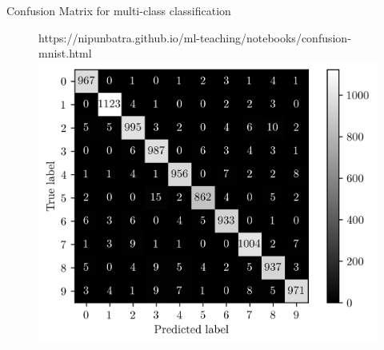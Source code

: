 \documentclass[usenames,dvipsnames]{beamer}
\begin{document}










\begin{frame}{Confusion Matrix for multi-class classification}
	\begin{figure}[htp]
		\centering
		\begin{notebookbox}{https://nipunbatra.github.io/ml-teaching/notebooks/confusion-mnist.html}
		  \includegraphics[scale=0.5]{../assets/accuracy-convention/figures/mnist-cm.png}
		\end{notebookbox}
	  \end{figure}
	
\end{frame}
\end{document}
